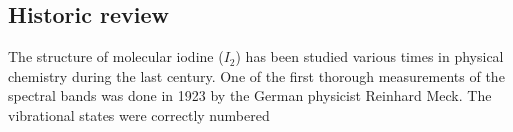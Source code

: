 \subsection{Historic review}
The structure of molecular iodine ($I_2$) has been studied various times in physical chemistry 
during the last century. One of the first thorough measurements of the spectral bands was done in 
1923 by the German physicist Reinhard Meck. The vibrational states were correctly numbered
